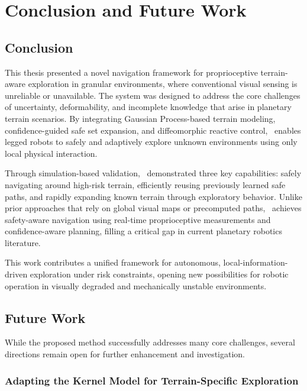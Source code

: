 \chapter{\leavevmode \newline Conclusion and Future Work}
\label{chap:Discussion}

\section{Conclusion}

This thesis presented a novel navigation framework for proprioceptive terrain-aware exploration in granular environments, where conventional visual sensing is unreliable or unavailable. The system was designed to address the core challenges of uncertainty, deformability, and incomplete knowledge that arise in planetary terrain scenarios. By integrating Gaussian Process-based terrain modeling, confidence-guided safe set expansion, and diffeomorphic reactive control, \algoname\ enables legged robots to safely and adaptively explore unknown environments using only local physical interaction.

Through simulation-based validation, \algoname\ demonstrated three key capabilities: safely navigating around high-risk terrain, efficiently reusing previously learned safe paths, and rapidly expanding known terrain through exploratory behavior. Unlike prior approaches that rely on global visual maps or precomputed paths, \algoname\ achieves safety-aware navigation using real-time proprioceptive measurements and confidence-aware planning, filling a critical gap in current planetary robotics literature.

This work contributes a unified framework for autonomous, local-information-driven exploration under risk constraints, opening new possibilities for robotic operation in visually degraded and mechanically unstable environments.

\section{Future Work}

While the proposed method successfully addresses many core challenges, several directions remain open for further enhancement and investigation.

\subsection{Adapting the Kernel Model for Terrain-Specific Exploration}

